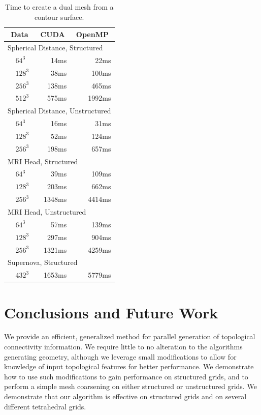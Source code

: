 \documentclass[10pt,journal,cspaper,compsoc]{IEEEtran}
\begin{document}
\begin{table}[htb]
  \centering
  \caption{Time to create a dual mesh from a contour surface.}
  \label{table:DualMesh}
  \begin{tabular}{l l r r}
    \multicolumn{2}{c}{Data}
    & \multicolumn{1}{c}{CUDA}
    & \multicolumn{1}{c}{OpenMP} \\
    \hline
    \multicolumn{4}{l}{Spherical Distance, Structured} \\
    \quad
    & $64^3$ &   14ms &  22ms \\
    & $128^3$ &  38ms & 100ms \\
    & $256^3$ & 138ms & 465ms \\
    & $512^3$ & 575ms &1992ms \\
    \multicolumn{4}{l}{Spherical Distance, Unstructured} \\
    & $64^3$ &   16ms &  31ms \\
    & $128^3$ &  52ms & 124ms \\
    & $256^3$ & 198ms & 657ms \\
    \multicolumn{4}{l}{MRI Head, Structured} \\
    & $64^3$ &   39ms & 109ms \\
    & $128^3$ & 203ms & 662ms \\
    & $256^3$ &1348ms &4414ms \\
    \multicolumn{4}{l}{MRI Head, Unstructured} \\
    & $64^3$ &  57ms &  139ms \\
    & $128^3$ &297ms &  904ms \\
    & $256^3$ &1321ms &4259ms \\
    \multicolumn{4}{l}{Supernova, Structured} \\
    & $432^3$ &1653ms &5779ms   
   
  \end{tabular}
\end{table}

\section{Conclusions and Future Work}
We provide an efficient, generalized method for parallel generation of topological connectivity information. We require little to no alteration to the algorithms generating geometry, although we leverage small modifications to allow for knowledge of input topological features for better performance. We demonstrate how to use such modifications to gain performance on structured grids, and to perform a simple mesh coarsening on either structured or unstructured grids. We demonstrate that our algorithm is effective on structured grids and on several different tetrahedral grids. 
\end{document}

